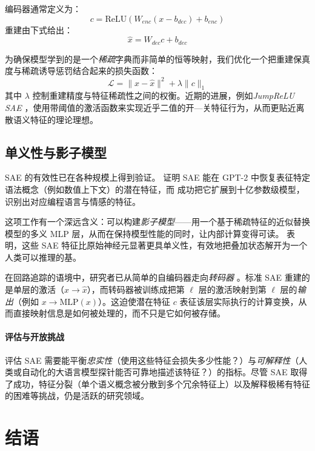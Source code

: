 编码器通常定义为：
\begin{equation}
    c = \text{ReLU}(W_{enc}(x - b_{dec}) + b_{enc})
\end{equation}
重建由下式给出：
\begin{equation}
    \hat{x} = W_{dec} c + b_{dec}
\end{equation}

为确保模型学到的是一个\emph{稀疏}字典而非简单的恒等映射，我们优化一个把重建保真度与稀疏诱导惩罚结合起来的损失函数：
\begin{equation}
    \mathcal{L} = \|x - \hat{x}\|^2 + \lambda \|c\|_1
\end{equation}
其中 $\lambda$ 控制重建精度与特征稀疏性之间的权衡。近期的进展，例如\emph{JumpReLU SAE} \citep{rajamanoharan2024jumping}，使用带阈值的激活函数来实现近乎二值的开—关特征行为，从而更贴近离散语义特征的理论理想。


\subsection{单义性与影子模型}
SAE 的有效性已在各种规模上得到验证。\citet{cunningham2023sparse} 证明 SAE 能在 GPT-2 中恢复表征特定语法概念（例如数值上下文）的潜在特征，而 \citet{gao2024scaling} 成功把它扩展到十亿参数级模型，识别出对应编程语言与情感的特征。

这项工作有一个深远含义：可以构建\emph{影子模型}——用一个基于稀疏特征的近似替换模型的多义 MLP 层，从而在保持模型性能的同时，让内部计算变得可读。\citet{bricken2023monosemanticity} 表明，这些 SAE 特征比原始神经元显著更具单义性，有效地把叠加状态解开为一个人类可以推理的基。

在回路追踪的语境中，研究者已从简单的自编码器走向\emph{转码器} \citep{dunefsky2024transcoders}。标准 SAE 重建的是单层的激活（$x \rightarrow \hat{x}$），而转码器被训练成把第 $\ell$ 层的激活映射到第 $\ell$ 层的\emph{输出}（例如 $x \rightarrow \text{MLP}(x)$）。这迫使潜在特征 $c$ 表征该层实际执行的计算变换，从而直接映射信息是如何被处理的，而不只是它如何被存储。

\paragraph{评估与开放挑战}
评估 SAE 需要能平衡\emph{忠实性}（使用这些特征会损失多少性能？）与\emph{可解释性}（人类或自动化的大语言模型探针能否可靠地描述该特征？）的指标。尽管 SAE 取得了成功，特征分裂（单个语义概念被分散到多个冗余特征上）以及解释极稀有特征的困难等挑战，仍是活跃的研究领域。
\section{结语}
